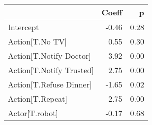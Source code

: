 \begin{tabular}{lrr}
\toprule
{} &  Coeff &    p \\
\midrule
Intercept                &  -0.46 & 0.28 \\
Action[T.No TV]          &   0.55 & 0.30 \\
Action[T.Notify Doctor]  &   3.92 & 0.00 \\
Action[T.Notify Trusted] &   2.75 & 0.00 \\
Action[T.Refuse Dinner]  &  -1.65 & 0.02 \\
Action[T.Repeat]         &   2.75 & 0.00 \\
Actor[T.robot]           &  -0.17 & 0.68 \\
\bottomrule
\end{tabular}
